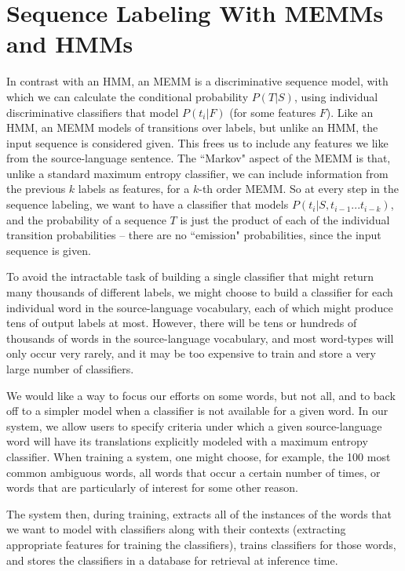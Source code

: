 \documentclass[11pt]{article}
\begin{document}
\section{Sequence Labeling With MEMMs and HMMs}
In contrast with an HMM, an MEMM is a discriminative sequence model, with
which we can calculate the conditional probability $P(T|S)$, using individual
discriminative classifiers that model $P(t_i | F)$ (for some features $F$).
Like an HMM, an MEMM models of transitions over labels, but unlike an HMM, the
input sequence is considered given. This frees us to include any features we
like from the source-language sentence. The ``Markov" aspect of the MEMM is
that, unlike a standard maximum entropy classifier, we can include information
from the previous $k$ labels as features, for a $k$-th order MEMM. So at every
step in the sequence labeling, we want to have a classifier that models 
$P(t_i | S, t_{i-1}...t_{i-k})$, and the probability of a sequence $T$ is just
the product of each of the individual transition probabilities -- there are no
``emission" probabilities, since the input sequence is given.

To avoid the intractable task of building a single classifier that might return
many thousands of different labels, we might choose to build a classifier for
each individual word in the source-language vocabulary, each of which might
produce tens of output labels at most. However, there will be tens or hundreds
of thousands of words in the source-language vocabulary, and most word-types
will only occur very rarely, and it may be too expensive to train and store a
very large number of classifiers.

We would like a way to focus our efforts on some words, but not all, and to
back off to a simpler model when a classifier is not available for a given
word. In our system, we allow users to specify criteria under which a given
source-language word will have its translations explicitly modeled with a
maximum entropy classifier. When training a system, one might choose, for
example, the 100 most common ambiguous words, all words that occur a certain
number of times, or words that are particularly of interest for some other
reason.

The system then, during training, extracts all of the instances of the words
that we want to model with classifiers along with their contexts (extracting
appropriate features for training the classifiers), trains classifiers for
those words, and stores the classifiers in a database for retrieval at
inference time.
\end{document}
